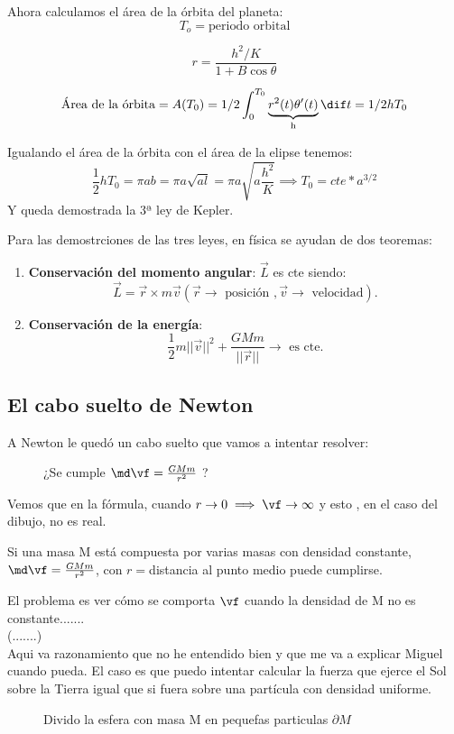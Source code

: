Ahora calculamos el área de la órbita del planeta:
$$T_o = \text{periodo orbital}$$

$$r= \frac{h^2/K}{1 + B\cos\theta}$$

$$\text{Área de la órbita} = A(T_0) = 1/2 \int_0^{T_0} \underbrace{r^2(t)\theta'(t)}_{\text{h}}\dif t = 1/2hT_0$$

Igualando el área de la órbita con  el área de la elipse tenemos:
$$\frac{1}{2}hT_0 = \pi ab= \pi a \sqrt{al} = \pi a\sqrt{a\frac{h^2}{K}} \implies T_0 = cte*a^{3/2}$$
Y queda demostrada la 3ª ley de Kepler.

\obs Para las demostrciones de las tres leyes, en física se ayudan de dos teoremas:
\begin{enumerate}
\item\textbf{Conservación del momento angular}:
$\overrightarrow{L}$ es cte siendo:
\[\overrightarrow{L} = \overrightarrow{r} \times m \overrightarrow{v} (\overrightarrow{r} \rightarrow  \text{ posición },  \overrightarrow{v} \rightarrow \text{ velocidad}).\]


\item\textbf{Conservación de la energía}:\\
\[\frac{1}{2}m||\overrightarrow{v}||^2 + \frac{GMm}{||\overrightarrow{r}||} \rightarrow \text{ es cte}.\]
\end{enumerate}

\subsection{El cabo suelto de Newton}
A Newton le quedó un cabo suelto que vamos a intentar resolver:

\begin{figure}[hbtp]
	\centering
	\caption{¿Se cumple $\md\vf = \frac{GMm}{r^2}$ ?}
\end{figure}
Vemos que en la fórmula, cuando $r \rightarrow 0 \implies \vf \rightarrow \infty$ y esto , en el caso del dibujo, no es real.

Si una masa M está compuesta por varias masas con densidad constante, $\md\vf = \frac{GMm}{r^2}$, con $r =$distancia al punto medio puede cumplirse.

El problema es ver cómo se comporta $\vf$ cuando la densidad de M no es constante.......\\
(.......)\\
Aqui va razonamiento que no he entendido bien y que me va a explicar Miguel cuando pueda.
El caso es que puedo intentar calcular la fuerza que ejerce el Sol sobre la Tierra igual que si fuera sobre una partícula con densidad uniforme.\\
\newpage
\begin{figure}[hbtp]
\centering
{}
\caption{Divido la esfera con masa M en pequefas particulas $\partial M$}
\label{figaaa}
\end{figure}

